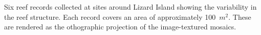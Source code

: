 \label{fig:reef_record_example}Six reef records collected at sites around Lizard Island showing the variability in the reef structure.  Each record covers an area of approximately 100~$m^2$.  These are rendered as the othographic projection of the image-textured mosaics.